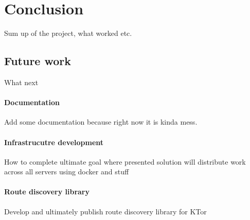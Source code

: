 \chapter{Conclusion}\label{ch:conclusion}
Sum up of the project, what worked etc.

\section{Future work}\label{sec:future-work}
What next

\subsubsection{Documentation}
Add some documentation because right now it is kinda mess.

\subsubsection{Infrastrucutre development}
How to complete ultimate goal where presented solution will distribute
work across all servers using docker and stuff

\subsubsection{Route discovery library}
Develop and ultimately publish route discovery library for KTor